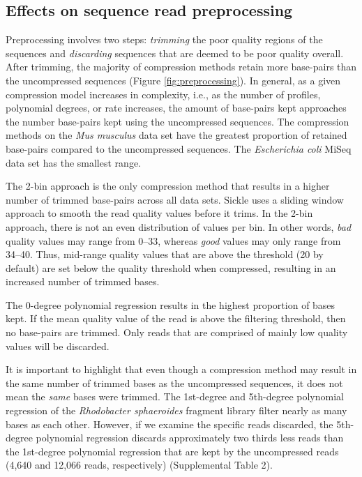 \documentclass{bioinfo}
\begin{document}
\subsection{Effects on sequence read preprocessing}

Preprocessing involves two steps: \emph{trimming} the poor quality
regions of the sequences and \emph{discarding} sequences that are
deemed to be poor quality overall. After trimming, the majority of
compression methods retain more base-pairs than the uncompressed
sequences (Figure \ref{fig:preprocessing}). In general, as a given
compression model increases in complexity, i.e., as the number of
profiles, polynomial degrees, or rate increases, the amount of
base-pairs kept approaches the number base-pairs kept using the
uncompressed sequences. The compression methods on the \textit{Mus
  musculus} data set have the greatest proportion of retained
base-pairs compared to the uncompressed sequences. The
\textit{Escherichia coli} MiSeq data set has the smallest range.

The 2-bin approach is the only compression method that results in a
higher number of trimmed base-pairs across all data sets. Sickle uses
a sliding window approach to smooth the read quality values before it
trims. In the 2-bin approach, there is not an even distribution of
values per bin. In other words, \emph{bad} quality values may range
from 0--33, whereas \emph{good} values may only range from
34--40. Thus, mid-range quality values that are above the threshold
(20 by default) are set below the quality threshold when compressed,
resulting in an increased number of trimmed bases.

The 0-degree polynomial regression results in the highest proportion
of bases kept. If the mean quality value of the read is above the
filtering threshold, then no base-pairs are trimmed. Only reads that
are comprised of mainly low quality values will be discarded.

It is important to highlight that even though a compression method may
result in the same number of trimmed bases as the uncompressed
sequences, it does not mean the \emph{same} bases were trimmed. The
1st-degree and 5th-degree polynomial regression of the
\textit{Rhodobacter sphaeroides} fragment library filter nearly as
many bases as each other. However, if we examine the specific reads
discarded, the 5th-degree polynomial regression discards approximately
two thirds less reads than the 1st-degree polynomial regression that
are kept by the uncompressed reads (4,640 and 12,066 reads,
respectively) (Supplemental Table 2).
\end{document}
